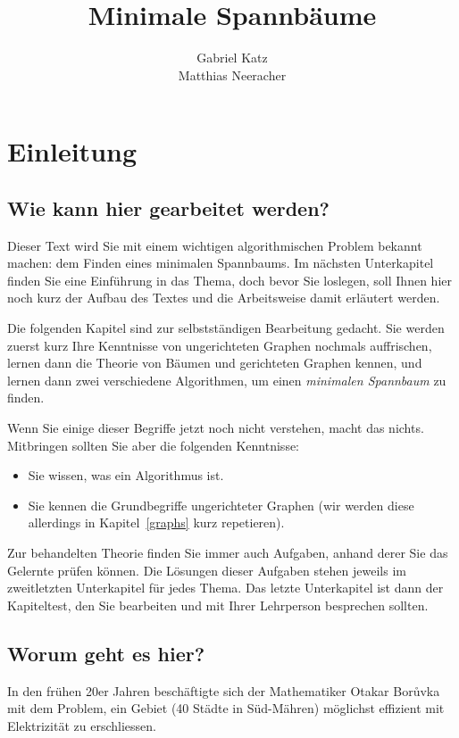 \documentclass[12pt,a4paper]{report}
\title{Minimale Spannb\"{a}ume}
\author{Gabriel Katz\\ Matthias Neeracher}
\theoremstyle{break}
\theoremstyle{plain}
\begin{document}
\maketitle
\tableofcontents
\chapter{Einleitung}

\section{Wie kann hier gearbeitet werden?}

Dieser Text wird Sie mit einem wichtigen algorithmischen Problem
bekannt machen: dem Finden eines minimalen Spannbaums. Im n\"{a}chsten
Unterkapitel finden Sie eine Einf\"{u}hrung in das Thema, doch bevor
Sie loslegen, soll Ihnen hier noch kurz der Aufbau des Textes und die
Arbeitsweise damit erl\"{a}utert werden.

Die folgenden Kapitel sind zur selbstst\"{a}ndigen Bearbeitung
gedacht. Sie werden zuerst kurz Ihre Kenntnisse von ungerichteten
Graphen nochmals auffrischen, lernen dann die Theorie von B\"{a}umen
und gerichteten Graphen kennen, und lernen dann zwei verschiedene
Algorithmen, um einen \emph{minimalen Spannbaum} zu finden.
 
Wenn Sie einige dieser Begriffe jetzt noch nicht verstehen, macht das
nichts. Mitbringen sollten Sie aber die folgenden Kenntnisse:

\begin{itemize}
\item Sie wissen, was ein Algorithmus ist.
\item Sie kennen die Grundbegriffe ungerichteter Graphen (wir werden
  diese allerdings in Kapitel~\ref{graphs} kurz repetieren).
\end{itemize}

Zur behandelten Theorie finden Sie immer auch Aufgaben, anhand derer
Sie das Gelernte pr\"{u}fen k\"{o}nnen. Die L\"{o}sungen dieser Aufgaben stehen
jeweils im zweitletzten Unterkapitel f\"{u}r jedes Thema. Das letzte
Unterkapitel ist dann der Kapiteltest, den Sie bearbeiten und mit
Ihrer Lehrperson besprechen sollten.

\newpage
\section{Worum geht es hier?}

In den fr\"uhen 20er Jahren besch\"aftigte sich der 
Mathematiker Otakar Bor\r{u}vka mit dem Problem, ein Gebiet (40
St\"{a}dte in S\"{u}d-M\"{a}hren) m\"{o}glichst effizient mit 
Elektrizit\"{a}t zu erschliessen.
\end{document}
